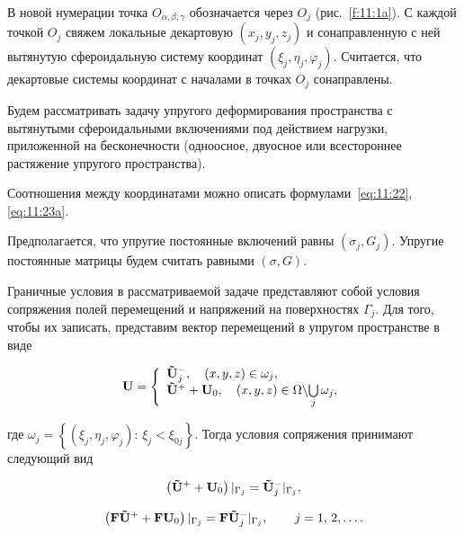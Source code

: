 В новой нумерации точка $O_{\alpha,\beta,\gamma}$ обозначается через $O_j$ (рис.~\ref{f:11:1a}). С каждой точкой $O_j$ свяжем локальные декартовую $(x_j,y_j,z_j)$ и сонаправленную с ней вытянутую сфероидальную систему координат $(\xi_j,\eta_j,\varphi_j)$. Считается, что декартовые системы координат с началами в точках $O_j$ сонаправлены.

Будем рассматривать задачу упругого деформирования пространства с вытянутыми сфероидальными включениями под действием нагрузки, приложенной на бесконечности (одноосное, двуосное или всестороннее растяжение упругого пространства).

Соотношения между координатами можно описать формулами~\eqref{eq:11:22}, \eqref{eq:11:23a}.

Предполагается, что упругие постоянные включений равны $(\sigma_j,G_j)$. Упругие постоянные матрицы будем считать равными $(\sigma,G)$.

Граничные условия в рассматриваемой задаче представляют собой условия сопряжения полей перемещений и напряжений на поверхностях $\Gamma_j$. Для того, чтобы их записать, представим вектор перемещений в упругом пространстве в виде

\begin{equation}
{\bf{U}} = \left\{ {\begin{array}{*{20}{l}}
{{\bf{\tilde U}}_j^ - ,\quad \left( {x,y,z} \right) \in \omega_j,}\\
{{{{\bf{\tilde U}}}^ + } + {{\bf{U}}_0},\quad \left( {x,y,z} \right) \in\Omega\backslash {\bigcup\limits_j\omega_j},}
\end{array}} \right.
\label{eq:11:23i}
\end{equation}

\noindent где $\omega_j = \left\{ {\left( {{\xi_j},{\eta _j},{\varphi _j}} \right):\, {\xi_j} < {\xi_{0j}}} \right\}$. Тогда условия сопряжения принимают следующий вид

\begin{equation}
\left( {{{{\bf{\tilde U}}}^ + } + {{\bf{U}}_0}} \right){|_{{\Gamma _j}}} = {\bf{\tilde U}}_j^ - {|_{{\Gamma _j}}},
\label{eq:11:24i}
\end{equation}

\begin{equation}
\left( {{\bf{F\tilde U^+}} + {\bf{F}}{{\bf{U}}_0}} \right){|_{{\Gamma _j}}} = {\bf{F}}{{\bf{\tilde U^-}}_j}{|_{{\Gamma _j}}},\qquad {\kern 1pt} j = 1,{\mkern 1mu} {\kern 1pt} 2,\dots.
\label{eq:11:25i}
\end{equation}

